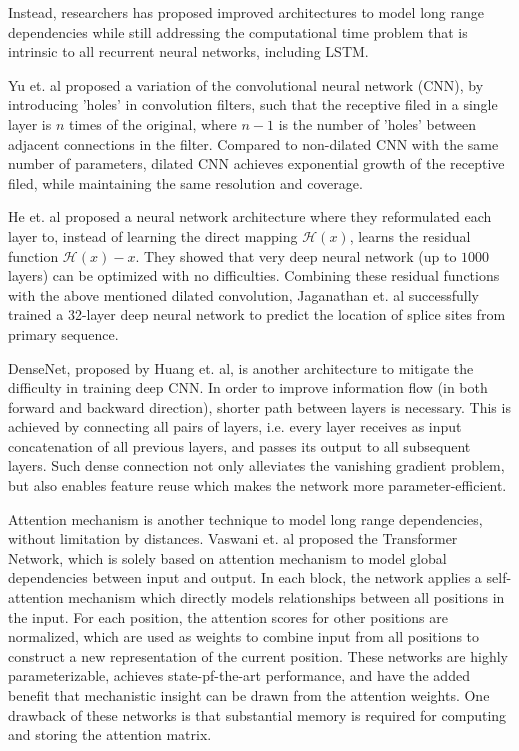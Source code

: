 \documentclass{proposal}
\begin{document}
Instead, researchers has proposed improved architectures to model long range dependencies
while still addressing the computational time problem that is intrinsic to all recurrent neural networks, including LSTM.

Yu et. al\cite{yu2015multi} proposed a variation of the convolutional neural network (CNN),
by introducing 'holes' in convolution filters, such that the receptive filed in a single layer is $n$ times of the original,
where $n-1$ is the number of 'holes' between adjacent connections in the filter.
Compared to non-dilated CNN with the same number of parameters,
dilated CNN achieves exponential growth of the receptive filed,
while maintaining the same resolution and coverage.


He et. al\cite{he2016deep} proposed a neural network architecture where they reformulated
each layer to, instead of learning the direct mapping $\mathcal{H}(x)$,
learns the residual function $\mathcal{H}(x) - x$.
They showed that very deep neural network (up to $1000$ layers) can be optimized with no difficulties.
Combining these residual functions with the above mentioned dilated convolution,
Jaganathan et. al\cite{jaganathan2019predicting} successfully trained a 32-layer deep neural network to predict
the location of splice sites from primary sequence.


DenseNet, proposed by Huang et. al\cite{huang2017densely}, is another architecture
to mitigate the difficulty in training deep CNN.
In order to improve information flow (in both forward and backward direction),
shorter path between layers is necessary.
This is achieved by connecting all pairs of layers,
i.e. every layer receives as input concatenation of all previous layers, and passes its output to all subsequent layers.
Such dense connection not only alleviates the vanishing gradient problem, but also enables feature reuse which makes the network more parameter-efficient.



Attention mechanism is another technique to model long range dependencies,
without limitation by distances.
Vaswani et. al\cite{vaswani2017attention} proposed the Transformer Network,
which is solely based on attention mechanism to model global dependencies between input and output.
In each block, the network applies a self-attention mechanism
which directly models relationships between all positions in the input.
For each position, the attention scores for other positions are normalized,
which are used as weights to combine input from all positions to construct a new representation of the current position.
These networks are highly parameterizable, achieves state-pf-the-art performance,
and have the added benefit that mechanistic insight can be drawn from the attention weights.
One drawback of these networks is that substantial memory is required for computing and storing the attention matrix.
\end{document}
